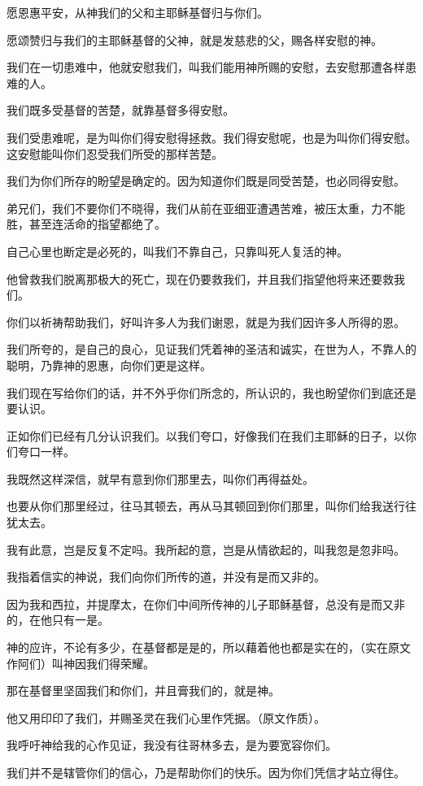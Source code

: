 \documentclass[12pt,oneside]{book}
\begin{document}
愿恩惠平安，从神我们的父和主耶稣基督归与你们。

愿颂赞归与我们的主耶稣基督的父神，就是发慈悲的父，赐各样安慰的神。

我们在一切患难中，他就安慰我们，叫我们能用神所赐的安慰，去安慰那遭各样患难的人。

我们既多受基督的苦楚，就靠基督多得安慰。

我们受患难呢，是为叫你们得安慰得拯救。我们得安慰呢，也是为叫你们得安慰。这安慰能叫你们忍受我们所受的那样苦楚。

我们为你们所存的盼望是确定的。因为知道你们既是同受苦楚，也必同得安慰。

弟兄们，我们不要你们不晓得，我们从前在亚细亚遭遇苦难，被压太重，力不能胜，甚至连活命的指望都绝了。

自己心里也断定是必死的，叫我们不靠自己，只靠叫死人复活的神。

他曾救我们脱离那极大的死亡，现在仍要救我们，并且我们指望他将来还要救我们。

你们以祈祷帮助我们，好叫许多人为我们谢恩，就是为我们因许多人所得的恩。

我们所夸的，是自己的良心，见证我们凭着神的圣洁和诚实，在世为人，不靠人的聪明，乃靠神的恩惠，向你们更是这样。

我们现在写给你们的话，并不外乎你们所念的，所认识的，我也盼望你们到底还是要认识。

正如你们已经有几分认识我们。以我们夸口，好像我们在我们主耶稣的日子，以你们夸口一样。

我既然这样深信，就早有意到你们那里去，叫你们再得益处。

也要从你们那里经过，往马其顿去，再从马其顿回到你们那里，叫你们给我送行往犹太去。

我有此意，岂是反复不定吗。我所起的意，岂是从情欲起的，叫我忽是忽非吗。

我指着信实的神说，我们向你们所传的道，并没有是而又非的。

因为我和西拉，并提摩太，在你们中间所传神的儿子耶稣基督，总没有是而又非的，在他只有一是。

神的应许，不论有多少，在基督都是是的，所以藉着他也都是实在的，（实在原文作阿们）叫神因我们得荣耀。

那在基督里坚固我们和你们，并且膏我们的，就是神。

他又用印印了我们，并赐圣灵在我们心里作凭据。（原文作质）。

我呼吁神给我的心作见证，我没有往哥林多去，是为要宽容你们。

我们并不是辖管你们的信心，乃是帮助你们的快乐。因为你们凭信才站立得住。
\end{document}
